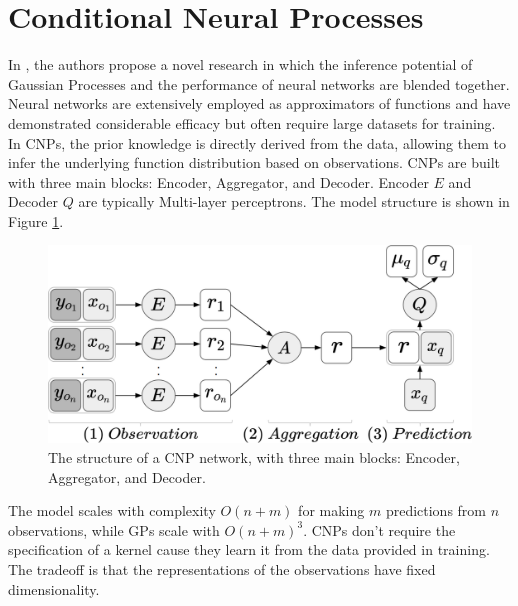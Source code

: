 \section{Conditional Neural Processes}
In \cite{DBLP:journals/corr/abs-1807-01613}, the authors propose a novel research in which the inference potential of Gaussian Processes and the performance of neural networks are blended together. Neural networks are extensively employed as approximators of functions and have demonstrated considerable efficacy but often require large datasets for training. In CNPs, the prior knowledge is directly derived from the data, allowing them to infer the underlying function distribution based on observations. CNPs are built with three main blocks: Encoder, Aggregator, and Decoder. Encoder $E$ and Decoder $Q$ are typically Multi-layer perceptrons. The model structure is shown in Figure \ref{fig:cnp}. 
\begin{figure}
	\centering
	\includegraphics[width=0.5\linewidth]{Images/CNP.png}
	\caption{The structure of a CNP network, with three main blocks: Encoder, Aggregator, and Decoder.}
	\label{fig:cnp}
\end{figure}
The model scales with complexity $O(n+m)$ for making $m$ predictions from $n$ observations, while GPs scale with $O(n+m)^3$. CNPs don't require the specification of a kernel cause they learn it from the data provided in training. The tradeoff is that the representations of the observations have fixed dimensionality.


